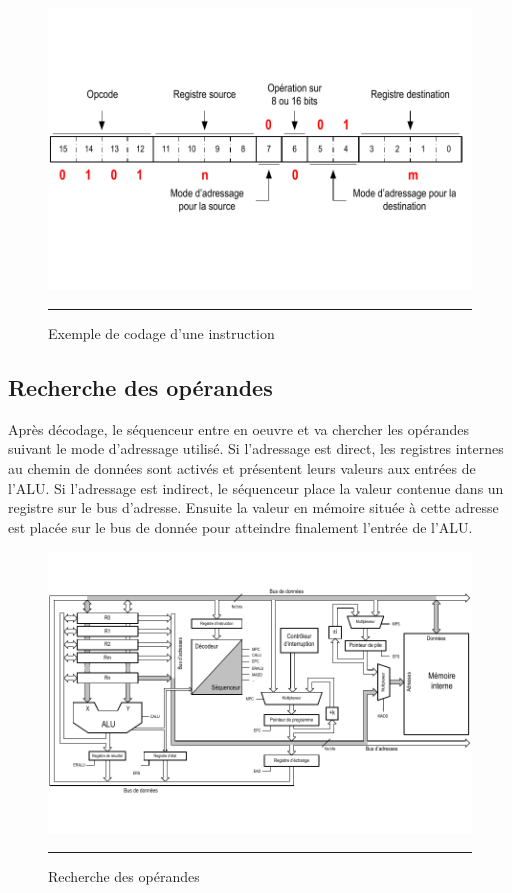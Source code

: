 \begin{figure}[H]
  \centering
  \includegraphics[angle=0, width=14cm, trim=0 70 0 70,clip]{./Figures/cpu/opcode2.pdf}
  \rule{35em}{0.5pt}
  \caption[opcode2]{Exemple de codage d'une instruction}
  \label{fig:opcode2}
\end{figure}

\newpage
\subsection{Recherche des opérandes}
Après décodage, le séquenceur entre en oeuvre et va chercher les opérandes suivant le mode d'adressage utilisé. Si l'adressage est direct, les registres internes au chemin de données sont activés et présentent leurs valeurs aux entrées de l'ALU. Si l'adressage est indirect, le séquenceur place la valeur contenue dans un registre sur le bus d'adresse. Ensuite la valeur en mémoire située à cette adresse est placée sur le bus de donnée pour atteindre finalement l'entrée de l'ALU.

\begin{figure}[htb]
  \centering
  \includegraphics[angle=0, width=15cm, trim=0 30 0 30,clip]{./Figures/cpu/instruction3.pdf}
  \rule{35em}{0.5pt}
  \caption[instr3]{Recherche des opérandes}
  \label{fig:instr3}
\end{figure}
 
